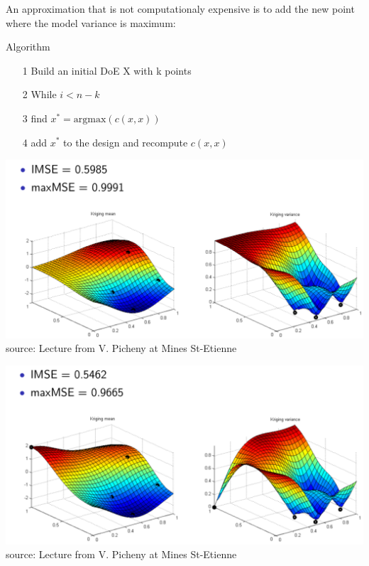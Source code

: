 \begin{frame}{}
An approximation that is not computationaly expensive is to add the new point where the model variance is maximum:
\begin{block}{Algorithm}
	\begin{itemize}
		\item[1] Build an initial DoE X with k points
		\item[2] While $i < n-k$
		\item[3] \qquad find $x^* = \mathrm{argmax}(c(x,x))$
		\item[4] \qquad add  $x^*$ to the design and recompute $c(x,x)$
	\end{itemize}
\end{block}
\end{frame}

\begin{frame}{}
\vspace{5mm}
\includegraphics[width=\textwidth]{2_Design_of_experiments/figures/adaptative1}\\
\vfill
source: Lecture from V. Picheny at Mines St-Etienne
\end{frame}

\begin{frame}{}
\vspace{5mm}
\includegraphics[width=\textwidth]{2_Design_of_experiments/figures/adaptative2}\\
\vfill
source: Lecture from V. Picheny at Mines St-Etienne
\end{frame}


